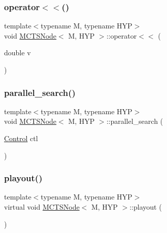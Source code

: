 \mbox{\label{class_m_c_t_s_node_ad72e84b8b8c6e814dfae4a697ddb6acd}} 
\subsubsection{\texorpdfstring{operator$<$$<$()}{operator<<()}}
{\footnotesize\ttfamily template$<$typename M, typename H\+YP$>$ \\
void \hyperlink{class_m_c_t_s_node}{M\+C\+T\+S\+Node}$<$ M, H\+YP $>$\+::operator$<$$<$ (\begin{DoxyParamCaption}\item[{double}]{v }\end{DoxyParamCaption})\hspace{0.3cm}{\ttfamily [inline]}}

\mbox{\label{class_m_c_t_s_node_acd94e02e155886ab71a2922815cd8285}} 
\subsubsection{\texorpdfstring{parallel\+\_\+search()}{parallel\_search()}}
{\footnotesize\ttfamily template$<$typename M, typename H\+YP$>$ \\
void \hyperlink{class_m_c_t_s_node}{M\+C\+T\+S\+Node}$<$ M, H\+YP $>$\+::parallel\+\_\+search (\begin{DoxyParamCaption}\item[{\hyperlink{struct_control}{Control}}]{ctl }\end{DoxyParamCaption})\hspace{0.3cm}{\ttfamily [inline]}}

\mbox{\label{class_m_c_t_s_node_a9b98535db702f0e9ee221615bd658214}} 
\subsubsection{\texorpdfstring{playout()}{playout()}}
{\footnotesize\ttfamily template$<$typename M, typename H\+YP$>$ \\
virtual void \hyperlink{class_m_c_t_s_node}{M\+C\+T\+S\+Node}$<$ M, H\+YP $>$\+::playout (\begin{DoxyParamCaption}{ }\end{DoxyParamCaption})\hspace{0.3cm}{\ttfamily [pure virtual]}}




